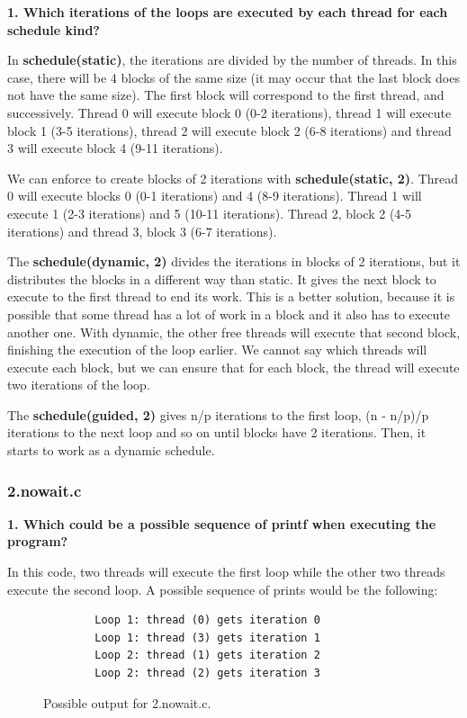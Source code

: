 \documentclass[12pt, a4paper]{article}
\begin{document}
\textbf{1. Which iterations of the loops are executed by each thread for each schedule kind?}

In \textbf{schedule(static)}, the iterations are divided by the number of threads. In this case, there will be 4 blocks of the same size (it may occur that the last block does not have the same size). The first block will correspond to the first thread, and successively. Thread 0 will execute block 0 (0-2 iterations), thread 1 will execute block 1 (3-5 iterations), thread 2 will execute block 2 (6-8 iterations) and thread 3 will execute block 4 (9-11 iterations).

We can enforce to create blocks of 2 iterations with \textbf{schedule(static, 2)}. Thread 0 will execute blocks 0 (0-1 iterations) and 4 (8-9 iterations). Thread 1 will execute 1 (2-3 iterations) and 5 (10-11 iterations). Thread 2, block 2 (4-5 iterations) and thread 3, block 3 (6-7 iterations).

The \textbf{schedule(dynamic, 2)} divides the iterations in blocks of 2 iterations, but it distributes the blocks in a different way than static. It gives the next block to execute to the first thread to end its work. This is a better solution, because it is possible that some thread has a lot of work in a block and it also has to execute another one. With dynamic, the other free threads will execute that second block, finishing the execution of the loop earlier. We cannot say which threads will execute each block, but we can ensure that for each block, the thread will execute two iterations of the loop.

The \textbf{schedule(guided, 2)} gives n/p iterations to the first loop, (n - n/p)/p iterations to the next loop and so on until blocks have 2 iterations. Then, it starts to work as a dynamic schedule.

\subsubsection{2.nowait.c}

\textbf{1. Which could be a possible sequence of printf when executing the program?}

In this code, two threads will execute the first loop while the other two threads execute the second loop. A possible sequence of prints would be the following:

\begin{figure}[H]
	\begin{lstlisting}
		Loop 1: thread (0) gets iteration 0
		Loop 1: thread (3) gets iteration 1
		Loop 2: thread (1) gets iteration 2
		Loop 2: thread (2) gets iteration 3
	\end{lstlisting}
	\caption{Possible output for 2.nowait.c.}
\end{figure}
\end{document}

